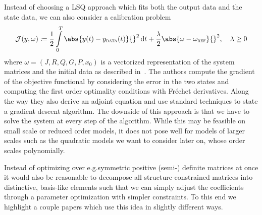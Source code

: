 
Instead of choosing a \ac{LSQ} approach which fits both the output data and the state data, we can also consider a calibration problem
\begin{equation}\label{eq:günther-calibration-objective}
    \mcl{J}(y, \omega) \coloneqq \frac{1}{2} \int\limits_0^T \abs{y(t) - y_\msc{data}(t)}{}^2 \dif t + \frac{\lambda}{2} \abs{\omega - \omega_\msc{ref}}{}^2, \quad \lambda \geq 0
\end{equation}
where $\omega = (J, R, Q, G, P, x_0)$ is a vectorized representation of the system matrices and the initial data as described in~\cite{Günther2023}.
The authors compute the gradient of the objective functional by considering the error in the two states and computing the first order optimality conditions with Fréchet derivatives.
Along the way they also derive an adjoint equation and use standard techniques to state a gradient descent algorithm.
The downside of this approach is that we have to solve the system at every step of the algorithm.
While this may be feasible on small scale or reduced order models, it does not pose well for models of larger scales such as the quadratic models we want to consider later on, whose order scales polynomially.


Instead of optimizing over e.\@ g.\@ symmetric positive (semi-) definite matrices at once it would also be reasonable to decompose all structure-constrained matrices into distinctive, basis-like elements such that we can simply adjust the coefficients through a parameter optimization with simpler constraints.
To this end we highlight a couple papers which use this idea in slightly different ways.


